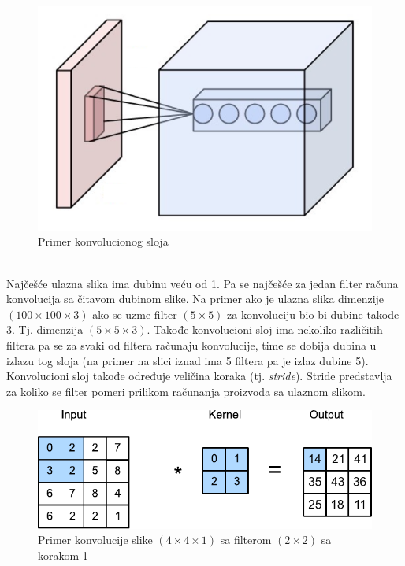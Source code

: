 \documentclass[a4paper,fleqn,12pt]{JMThesis}
\theoremstyle{plain}
\theoremstyle{definition}
\theoremstyle{definition}
\begin{document}
\begin{figure}[!ht]
	\centering
    \includegraphics[scale=0.4]{../graph-visuals/conv-filter.png}
	\caption{Primer konvolucionog sloja}
\end{figure}\\
Najčešće ulazna slika ima dubinu veću od 1. Pa se najčešće za jedan filter računa konvolucija sa čitavom dubinom slike.
Na primer ako je ulazna slika dimenzije $(100 \times 100 \times 3)$ ako se uzme filter $(5 \times 5)$ za konvoluciju bio bi 
dubine takođe 3. Tj. dimenzija $(5 \times 5 \times 3)$. Takođe konvolucioni sloj ima nekoliko različitih filtera pa se za svaki od
filtera računaju konvolucije, time se dobija dubina u izlazu tog sloja (na primer na slici iznad ima 5 filtera pa je izlaz dubine 5).
Konvolucioni sloj takođe određuje veličina koraka (tj. \textit{stride}). Stride predstavlja za koliko se filter pomeri prilikom računanja
proizvoda sa ulaznom slikom. 
\begin{figure}[!ht]
	\centering
    \includegraphics[scale=1]{../graph-visuals/convolution-operation-stride-1.pdf}
	\caption{Primer konvolucije slike $(4 \times 4 \times 1)$ sa filterom $(2 \times 2)$ sa korakom 1}
\end{figure}\\
\end{document}
